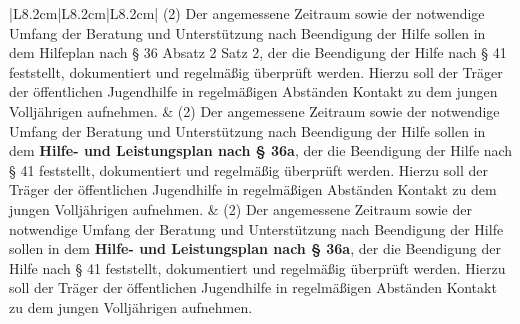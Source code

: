 \documentclass[10pt,a4paper,landscape]{article}
\begin{document}
\begin{longtable}{|L{8.2cm}|L{8.2cm}|L{8.2cm}|}
(2) Der angemessene Zeitraum sowie der  \newline notwendige Umfang der Beratung und  \newline Unterstützung nach Beendigung der Hilfe  \newline sollen in dem \textcolor{diffred}{Hilfeplan} nach \S{} \textcolor{diffred}{36 Absatz 2  \newline Satz 2,} der die Beendigung der Hilfe nach  \newline \S{} 41 feststellt, dokumentiert und  \newline regelmäßig überprüft werden. Hierzu soll  \newline der Träger der öffentlichen Jugendhilfe in  \newline regelmäßigen Abständen Kontakt zu dem  \newline jungen Volljährigen aufnehmen. & (2) Der angemessene Zeitraum sowie der  \newline notwendige Umfang der Beratung und  \newline Unterstützung nach Beendigung der Hilfe  \newline sollen in dem \textbf{Hilfe- und Leistungsplan  \newline nach \S{} 36a}, der die Beendigung der Hilfe  \newline nach \S{} 41 feststellt, dokumentiert und  \newline regelmäßig überprüft werden. Hierzu soll  \newline der Träger der öffentlichen Jugendhilfe in  \newline regelmäßigen Abständen Kontakt zu dem  \newline jungen Volljährigen aufnehmen. & (2) Der angemessene Zeitraum sowie der  \newline notwendige Umfang der Beratung und  \newline Unterstützung nach Beendigung der Hilfe  \newline sollen in dem \textbf{Hilfe- und Leistungsplan  \newline nach \S{} 36a}, der die Beendigung der Hilfe  \newline nach \S{} 41 feststellt, dokumentiert und  \newline regelmäßig überprüft werden. Hierzu soll  \newline der Träger der öffentlichen Jugendhilfe in  \newline regelmäßigen Abständen Kontakt zu dem  \newline jungen Volljährigen aufnehmen. \\

\end{longtable}
\end{document}
